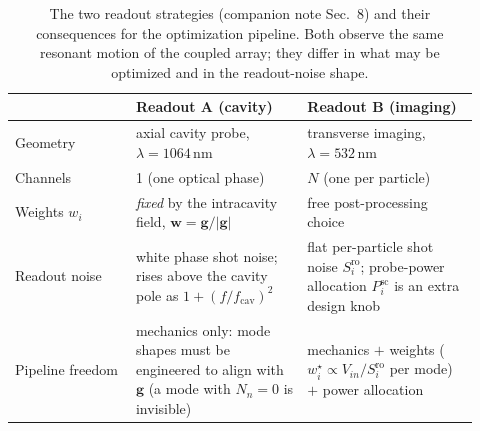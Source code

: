 \documentclass[11pt, letterpaper]{article}
\begin{document}
\begin{table}[h]
\centering
\caption{The two readout strategies (companion note Sec.~8) and their
consequences for the optimization pipeline.  Both observe the same
resonant motion of the coupled array; they differ in what may be
optimized and in the readout-noise shape.}
\label{tab:readouts}
\begin{tabular}{@{}p{0.24\linewidth}p{0.34\linewidth}p{0.34\linewidth}@{}}
\toprule
 & \textbf{Readout A (cavity)} & \textbf{Readout B (imaging)} \\
\midrule
Geometry & axial cavity probe, $\lambda = 1064$\,nm &
  transverse imaging, $\lambda = 532$\,nm \\
Channels & 1 (one optical phase) & $N$ (one per particle) \\
Weights $w_i$ & \emph{fixed} by the intracavity field,
  $\mathbf{w} = \mathbf{g}/|\mathbf{g}|$ & free post-processing choice \\
Readout noise & white phase shot noise; rises above the cavity pole as
  $1 + (f/f_{\mathrm{cav}})^2$ & flat per-particle shot noise
  $S_i^{\mathrm{ro}}$; probe-power allocation $P_i^{\mathrm{sc}}$ is an
  extra design knob \\
Pipeline freedom & mechanics only: mode shapes must be engineered to
  align with $\mathbf{g}$ (a mode with $N_n = 0$ is invisible) &
  mechanics $+$ weights ($w_i^{\star} \propto V_{in}/S_i^{\mathrm{ro}}$
  per mode) $+$ power allocation \\
\bottomrule
\end{tabular}
\end{table}
\end{document}
